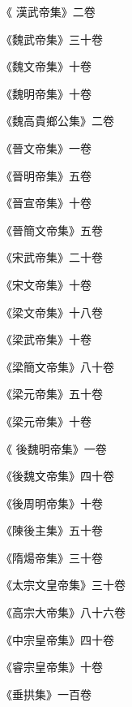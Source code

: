 \begin{pinyinscope}
 《
 漢武帝集》二卷



 《魏武帝集》三十卷



 《魏文帝集》十卷



 《魏明帝集》十卷



 《魏高貴鄉公集》二卷



 《晉文帝集》一卷



 《晉明帝集》五卷



 《晉宣帝集》十卷



 《晉簡文帝集》五卷



 《宋武帝集》二十卷



 《宋文帝集》十卷



 《梁文帝集》十八卷



 《梁武帝集》十卷



 《梁簡文帝集》八十卷



 《梁元帝集》五十卷



 《梁元帝集》十卷



 《
 後魏明帝集》一卷



 《後魏文帝集》四十卷



 《後周明帝集》十卷



 《陳後主集》五十卷



 《隋煬帝集》三十卷



 《太宗文皇帝集》三十卷



 《高宗大帝集》八十六卷



 《中宗皇帝集》四十卷



 《睿宗皇帝集》十卷



 《垂拱集》一百卷




\end{pinyinscope}
